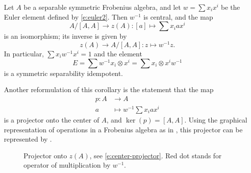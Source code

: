 \begin{corollary}\label{c:euler3}
  Let $A$ be a separable symmetric Frobenius algebra, and let $w=\sum x_ix^i$
  be the Euler element defined by \eqref{e:euler2}. Then $w^{-1}$ is central,
  and the map
  \begin{equation}\label{e:center-isom2}
    A/[A,A] \to z(A)\colon [a]\mapsto \sum x_iax^i
  \end{equation}
  is an isomorphism; its inverse is given by
  \begin{equation}\label{e:center-isom3}
    z(A) \to A/[A,A]\colon z \mapsto w^{-1}z.
  \end{equation}
  In particular, $\sum x_i w^{-1}x^i=1$ and the
  element
  $$
    E= \sum w^{-1} x_i \otimes x^i = \sum x_i \otimes x^i w^{-1}
  $$
  is a symmetric separability idempotent.
\end{corollary}

Another reformulation of this corollary is the statement that the map
\begin{equation}\label{e:center-projector}
  \begin{aligned}
    p\colon A&\to A\\
            a&\mapsto w^{-1}\sum x_i a x^i
  \end{aligned}
\end{equation}
is a projector onto the center of $A$, and $\ker(p)=[A,A]$. Using the graphical
representation of operations in a Frobenius algebra as in ,
this projector can be represented by .

\begin{figure}[ht]
  \caption{Projector onto $z(A)$, see \eqref{e:center-projector}. Red dot stands
  for operator of multiplication by $w^{-1}$.}
  \label{f:frob-center}
\end{figure}


